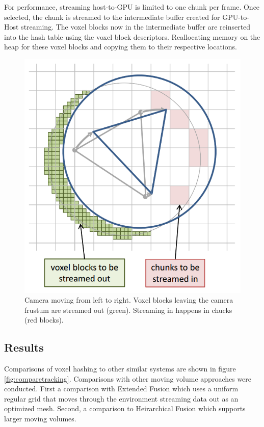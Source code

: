 \documentclass[10pt, twocolumn]{article}
\begin{document}
For performance, streaming host-to-GPU is limited to one chunk per frame. Once
selected, the chunk is streamed to the intermediate buffer created for
GPU-to-Host streaming. The voxel blocks now in the intermediate buffer are
reinserted into the hash table using the voxel block descriptors. Reallocating
memory on the heap for these voxel blocks and copying them to their respective
locations. 

\begin{figure}
  \centering
  \includegraphics[width=1.0\linewidth]{streaming}
  \caption{Camera moving from left to right. Voxel blocks leaving the camera
    frustum are streamed out (green). Streaming in happens in chucks (red blocks).}
  \label{fig:streaming}
\end{figure}



\subsection{Results}
Comparisons of voxel hashing to other similar systems are shown in 
figure \ref{fig:comparetracking}. Comparisons with other moving volume approaches were
conducted. First a comparison with Extended Fusion \cite{Whelan14} \cite{roth2012moving} which uses a
uniform regular grid that moves through the environment streaming data out as an
optimized mesh. Second, a comparison to Heirarchical Fusion
\cite{chen2013scalable} which supports larger moving volumes.
\end{document}
